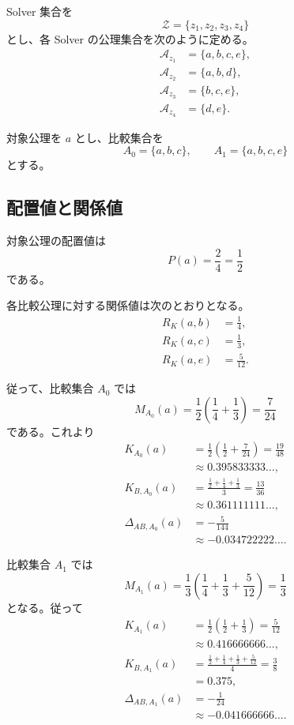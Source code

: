 \documentclass[a4paper,11pt]{ltjsarticle}
\begin{document}
Solver 集合を
\begin{equation}
  \mathcal{Z}=\{z_1,z_2,z_3,z_4\}
\end{equation}
とし、各 Solver の公理集合を次のように定める。
\begin{align}
  \mathcal{A}_{z_1}&=\{a,b,c,e\},\\
  \mathcal{A}_{z_2}&=\{a,b,d\},\\
  \mathcal{A}_{z_3}&=\{b,c,e\},\\
  \mathcal{A}_{z_4}&=\{d,e\}.
\end{align}

対象公理を $a$ とし、比較集合を
\begin{equation}
  A_0=\{a,b,c\},\qquad
  A_1=\{a,b,c,e\}
\end{equation}
とする。

\subsection{配置値と関係値}

対象公理の配置値は
\begin{equation}
  P(a)=\frac24=\frac12
\end{equation}
である。

各比較公理に対する関係値は次のとおりとなる。
\begin{align}
  R_K(a,b)&=\frac14,\\
  R_K(a,c)&=\frac13,\\
  R_K(a,e)&=\frac5{12}.
\end{align}

従って、比較集合 $A_0$ では
\begin{equation}
  M_{A_0}(a)
  =
  \frac12\left(\frac14+\frac13\right)
  =\frac7{24}
\end{equation}
である。これより
\begin{align}
  K_{A_0}(a)
  &=\frac12\left(\frac12+\frac7{24}\right)
    =\frac{19}{48}\\
  &\approx0.395833333\ldots,\\
  K_{B,A_0}(a)
  &=\frac{\frac12+\frac14+\frac13}{3}
    =\frac{13}{36}\\
  &\approx0.361111111\ldots,\\
  \Delta_{AB,A_0}(a)
  &=-\frac5{144}\\
  &\approx-0.034722222\ldots.
\end{align}

比較集合 $A_1$ では
\begin{equation}
  M_{A_1}(a)
  =
  \frac13\left(\frac14+\frac13+\frac5{12}\right)
  =\frac13
\end{equation}
となる。従って
\begin{align}
  K_{A_1}(a)
  &=\frac12\left(\frac12+\frac13\right)
    =\frac5{12}\\
  &\approx0.416666666\ldots,\\
  K_{B,A_1}(a)
  &=\frac{\frac12+\frac14+\frac13+\frac5{12}}4
    =\frac38\\
  &=0.375,\\
  \Delta_{AB,A_1}(a)
  &=-\frac1{24}\\
  &\approx-0.041666666\ldots.
\end{align}
\end{document}
